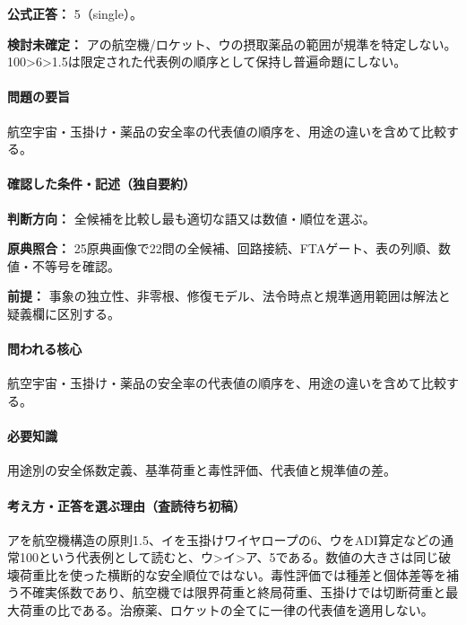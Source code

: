 \textbf{公式正答：} 5（single）。

\par\textbf{検討未確定：} アの航空機/ロケット、ウの摂取薬品の範囲が規準を特定しない。100>6>1.5は限定された代表例の順序として保持し普遍命題にしない。

\paragraph{問題の要旨} 航空宇宙・玉掛け・薬品の安全率の代表値の順序を、用途の違いを含めて比較する。

\paragraph{確認した条件・記述（独自要約）}\mbox{}\par

\noindent\textbf{判断方向：} 全候補を比較し最も適切な語又は数値・順位を選ぶ。\par

\noindent\textbf{原典照合：} 25原典画像で22問の全候補、回路接続、FTAゲート、表の列順、数値・不等号を確認。\par

\noindent\textbf{前提：} 事象の独立性、非零根、修復モデル、法令時点と規準適用範囲は解法と疑義欄に区別する。\par

\paragraph{問われる核心} 航空宇宙・玉掛け・薬品の安全率の代表値の順序を、用途の違いを含めて比較する。

\paragraph{必要知識} 用途別の安全係数定義、基準荷重と毒性評価、代表値と規準値の差。

\paragraph{考え方・正答を選ぶ理由（査読待ち初稿）} アを航空機構造の原則1.5、イを玉掛けワイヤロープの6、ウをADI算定などの通常100という代表例として読むと、ウ>イ>ア、5である。数値の大きさは同じ破壊荷重比を使った横断的な安全順位ではない。毒性評価では種差と個体差等を補う不確実係数であり、航空機では限界荷重と終局荷重、玉掛けでは切断荷重と最大荷重の比である。治療薬、ロケットの全てに一律の代表値を適用しない。

